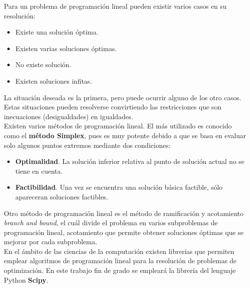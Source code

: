 Para un problema de programación lineal pueden existir varios casos en su resolución:
\begin{itemize}
\item Existe una solución óptima.
\item Existen varias soluciones óptimas.
\item No existe solución.
\item Existen soluciones infitas.
\end{itemize}
La situación deseada es la primera, pero puede ocurrir alguno de los otro casos. Estas situaciones pueden resolverse convirtiendo las restricciones que son inecuaciones (desigualdades) en igualdades.\\

Existen varios métodos de programación lineal. El más utilizado es conocido como el \textbf{método Simplex}, pues es muy potente debido a que se basa en evaluar solo algunos puntos extremos mediante dos condiciones:
\begin{itemize}
\item \textbf{Optimalidad}. La solución inferior relativa al punto de solución actual no se tiene en cuenta.
  \item \textbf{Factibilidad}. Una vez se encuentra una solución básica factible, sólo apareceran soluciones factibles.
\end{itemize}
Otro método de programación lineal es el método de ramificación y acotamiento \textit{branch and bound}, el cuál divide el problema en varios subproblemas de programación lineal, acotamiento que permite obtener soluciones óptimas que se mejorar por cada subproblema.\\

En el ámbito de las ciencias de la computación existen librerías que permiten emplear algoritmos de programación lineal para la resolución de problemas de optimización. En este trabajo fin de grado se empleará la librería del lenguaje Python \textbf{Scipy}.
